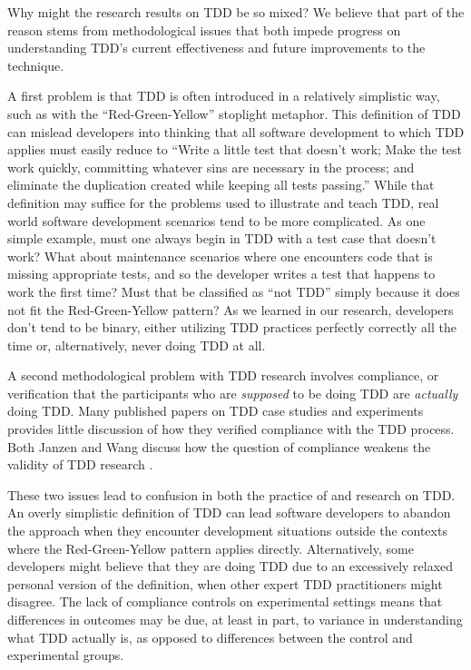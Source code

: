 \documentclass[11pt,twocolumn]{article}
\begin{document}
Why might the research results on TDD be so mixed?  We believe that part of
the reason stems from methodological issues that both impede progress on
understanding TDD's current effectiveness and future improvements to the technique. 

A first problem is that TDD is often introduced in a relatively simplistic
way, such as with the ``Red-Green-Yellow'' stoplight metaphor.  This
definition of TDD can mislead developers into thinking that all software
development to which TDD applies must easily reduce to ``Write a little test that
doesn't work; Make the test work quickly, committing whatever sins are
necessary in the process; and eliminate the duplication created while
keeping all tests passing.''  While that definition may suffice for the 
problems used to illustrate and teach TDD, real world software development
scenarios tend to be more complicated. As one simple example, must one
always begin in TDD with a test case that doesn't work? What about
maintenance scenarios where one encounters code that is missing appropriate
tests, and so the developer writes a test that happens to work the first
time?  Must that be classified as ``not TDD'' simply because it does not
fit the Red-Green-Yellow pattern?  As we learned in our research,
developers don't tend to be binary, either utilizing TDD practices
perfectly correctly all the time or, alternatively, never doing TDD at all.

A second methodological problem with TDD research involves compliance, or
verification that the participants who are {\em supposed} to be doing TDD are
{\em actually} doing TDD. Many published papers on TDD case studies and
experiments provides little discussion of how they verified compliance with
the TDD process.  Both Janzen and Wang discuss how the question of
compliance weakens the validity of TDD research \cite{Janzen:05, Wang:04}.

These two issues lead to confusion in both the practice of and research on
TDD.  An overly simplistic definition of TDD can lead software developers
to abandon the approach when they encounter development situations outside
the contexts where the Red-Green-Yellow pattern applies directly.
Alternatively, some developers might believe that they are doing TDD due to
an excessively relaxed personal version of the definition, when other
expert TDD practitioners might disagree.  The lack of compliance controls
on experimental settings means that differences in outcomes may be due, at
least in part, to variance in understanding what TDD actually is, as
opposed to differences between the control and experimental groups.
\end{document}
